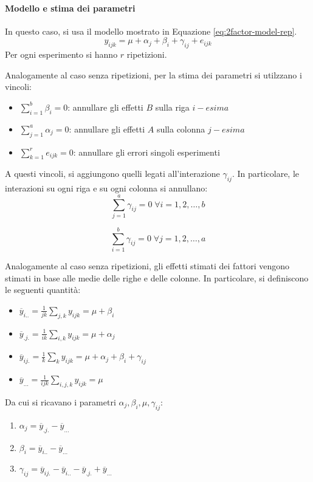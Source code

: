 \documentclass{article}
\begin{document}
\paragraph{Modello e stima dei parametri}
In questo caso, si usa il modello mostrato in Equazione \ref{eq:2factor-model-rep}.
\begin{equation}
  y_{ijk} = \mu + \alpha_j + \beta_i + \gamma_{ij} + e_{ijk}
  \label{eq:2factor-model-rep}
\end{equation}
Per ogni esperimento si hanno $r$ ripetizioni.

Analogamente al caso senza ripetizioni, per la stima dei parametri si utilzzano i vincoli:
\begin{itemize}
  \item $\sum_{i=1}^b\beta_i = 0$: annullare gli effetti $B$ sulla riga $i-esima$
  \item $\sum_{j=1}^a\alpha_j = 0$: annullare gli effetti $A$ sulla colonna $j-esima$
  \item $\sum_{k=1} ^r e_{ijk} = 0$: annullare gli errori singoli esperimenti
\end{itemize}
A questi vincoli, si aggiungono quelli legati all'interazione $\gamma_{ij}$. In particolare,
le interazioni su ogni riga e su ogni colonna si annullano:
\[
  \sum_{j=1}^{a}\gamma_{ij} = 0 \; \forall i = 1,2,\dots, b
\]

\[
  \sum_{i=1}^{b}\gamma_{ij} = 0 \; \forall j = 1,2,\dots, a
\]

Analogamente al caso senza ripetizioni, gli effetti stimati dei fattori vengono stimati in 
base alle medie delle righe e delle colonne. In particolare, si definiscono le seguenti 
quantità:
\begin{itemize}
  \item $\overline{y}_{i..} = \frac{1}{jk} \sum_{j,k}y_{ijk} = \mu + \beta_i$
  \item $\overline{y}_{.j.} = \frac{1}{ik} \sum_{i,k}y_{ijk} = \mu + \alpha_j $
  \item $\overline{y}_{ij.} = \frac{1}{k} \sum_{k}y_{ijk} = \mu + \alpha_j + \beta_i + \gamma_{ij} $
  \item $\overline{y}_{...} = \frac{1}{ijk} \sum_{i,j,k}y_{ijk} = \mu $
\end{itemize}

Da cui si ricavano i parametri $\alpha_j, \beta_i, \mu, \gamma_{ij}$:
\begin{enumerate}
  \item $\alpha_j = \overline{y}_{.j.} - \overline{y}_{...}$
  \item $\beta_i = \overline{y}_{i..} - \overline{y}_{...}$
  \item $\gamma_{ij} = \overline{y}_{ij.} - \overline{y}_{i..} - \overline{y}_{.j.} + \overline{y}_{...}$
\end{enumerate}
\end{document}
